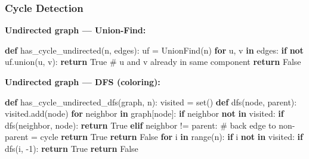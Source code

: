 \documentclass[11pt]{article}
\newenvironment{Shaded}{\begin{snugshade}}{\end{snugshade}}
\newcommand{\BuiltInTok}[1]{\textcolor[rgb]{0.50,0.55,0.55}{#1}}
\newcommand{\CommentTok}[1]{\textcolor[rgb]{0.48,0.49,0.49}{#1}}
\newcommand{\ControlFlowTok}[1]{\textcolor[rgb]{0.99,0.74,0.29}{\textbf{#1}}}
\newcommand{\DecValTok}[1]{\textcolor[rgb]{0.96,0.45,0.00}{#1}}
\newcommand{\KeywordTok}[1]{\textcolor[rgb]{0.81,0.81,0.76}{\textbf{#1}}}
\newcommand{\NormalTok}[1]{\textcolor[rgb]{0.81,0.81,0.76}{#1}}
\newcommand{\OperatorTok}[1]{\textcolor[rgb]{0.81,0.81,0.76}{#1}}
\newcommand{\VariableTok}[1]{\textcolor[rgb]{0.15,0.68,0.68}{#1}}
\begin{document}
\subsubsection{Cycle Detection}\label{cycle-detection}

\textbf{Undirected graph --- Union-Find:}


\begin{Shaded}
\begin{Highlighting}[]
\KeywordTok{def}\NormalTok{ has\_cycle\_undirected(n, edges):}
\NormalTok{    uf }\OperatorTok{=}\NormalTok{ UnionFind(n)}
    \ControlFlowTok{for}\NormalTok{ u, v }\KeywordTok{in}\NormalTok{ edges:}
        \ControlFlowTok{if} \KeywordTok{not}\NormalTok{ uf.union(u, v):}
            \ControlFlowTok{return} \VariableTok{True}   \CommentTok{\# u and v already in same component}
    \ControlFlowTok{return} \VariableTok{False}
\end{Highlighting}
\end{Shaded}

\textbf{Undirected graph --- DFS (coloring):}


\begin{Shaded}
\begin{Highlighting}[]
\KeywordTok{def}\NormalTok{ has\_cycle\_undirected\_dfs(graph, n):}
\NormalTok{    visited }\OperatorTok{=} \BuiltInTok{set}\NormalTok{()}
    \KeywordTok{def}\NormalTok{ dfs(node, parent):}
\NormalTok{        visited.add(node)}
        \ControlFlowTok{for}\NormalTok{ neighbor }\KeywordTok{in}\NormalTok{ graph[node]:}
            \ControlFlowTok{if}\NormalTok{ neighbor }\KeywordTok{not} \KeywordTok{in}\NormalTok{ visited:}
                \ControlFlowTok{if}\NormalTok{ dfs(neighbor, node): }\ControlFlowTok{return} \VariableTok{True}
            \ControlFlowTok{elif}\NormalTok{ neighbor }\OperatorTok{!=}\NormalTok{ parent:    }\CommentTok{\# back edge to non{-}parent = cycle}
                \ControlFlowTok{return} \VariableTok{True}
        \ControlFlowTok{return} \VariableTok{False}
    \ControlFlowTok{for}\NormalTok{ i }\KeywordTok{in} \BuiltInTok{range}\NormalTok{(n):}
        \ControlFlowTok{if}\NormalTok{ i }\KeywordTok{not} \KeywordTok{in}\NormalTok{ visited:}
            \ControlFlowTok{if}\NormalTok{ dfs(i, }\OperatorTok{{-}}\DecValTok{1}\NormalTok{): }\ControlFlowTok{return} \VariableTok{True}
    \ControlFlowTok{return} \VariableTok{False}
\end{Highlighting}
\end{Shaded}
\end{document}
